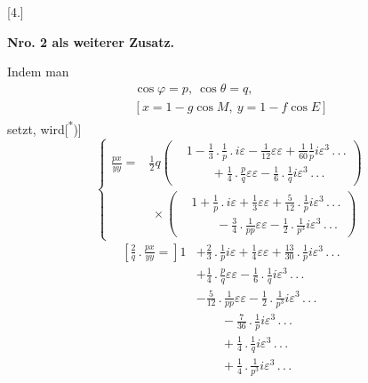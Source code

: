 \clearpage{}
\begingroup\makeatletter\let\veqno\@@leqno\makeatother
\newcommand{\vsroot}[1]{\mathord{\vcenter{\hbox{\Large\(\surd\)}}}#1}
\begin{center}[4.]\end{center}
\par
\begin{center}\textbf{Nro. 2 als weiterer Zusatz.}\end{center}
\noindent\hspace*{\parindent}Indem man
\begin{equation}\begin{gathered}
\cos\varphi=p,\ \cos\theta=q,\\
{}[x=1-g\cos M,\ y=1-f\cos E]
\end{gathered}\tag*{[30]}\end{equation}
\noindent setzt, wird[\textsuperscript{*})]
\begin{equation}\left\{\begin{aligned}
\frac{px}{yy}={}&\frac12q\left(\begin{aligned}
 &1-\frac13\,{.}\,\frac1p\,{.}\,i\varepsilon-\frac1{12}\varepsilon\varepsilon+\frac1{60}\frac1p i\varepsilon^3\,{.}\,{.}\,{.}\\
 &\qquad+\frac14\,{.}\,\frac pq\varepsilon\varepsilon-\frac16\,{.}\,\frac1q i\varepsilon^3\,{.}\,{.}\,{.}
\end{aligned}\right)\\
 &\ \times\left(\begin{aligned}
 &1+\frac1p\,{.}\,i\varepsilon+\frac13\varepsilon\varepsilon+\frac5{12}\,{.}\,\frac1p i\varepsilon^3\,{.}\,{.}\,{.}\\
 &\qquad-\frac34\,{.}\,\frac1{pp}\varepsilon\varepsilon-\frac12\,{.}\,\frac1{p^3}i\varepsilon^3\,{.}\,{.}\,{.}
\end{aligned}\right)
\end{aligned}\right.\tag*{[31]}\end{equation}
\[\begin{aligned}
\left[\frac2q\,{.}\,\frac{px}{yy}=\right]1
 &+\frac23\,{.}\,\frac1p i\varepsilon+\frac14\varepsilon\varepsilon+\frac{13}{30}\,{.}\,\frac1p i\varepsilon^3\,{.}\,{.}\,{.}\\
 &+\frac14\,{.}\,\frac pq\varepsilon\varepsilon-\frac16\,{.}\,\frac1q i\varepsilon^3\,{.}\,{.}\,{.}\\
 &-\frac5{12}\,{.}\,\frac1{pp}\varepsilon\varepsilon-\frac12\,{.}\,\frac1{p^3}i\varepsilon^3\,{.}\,{.}\,{.}\\
 &\qquad-\frac7{36}\,{.}\,\frac1p i\varepsilon^3\,{.}\,{.}\,{.}\\
 &\qquad+\frac14\,{.}\,\frac1q i\varepsilon^3\,{.}\,{.}\,{.}\\
 &\qquad+\frac14\,{.}\,\frac1{p^3}i\varepsilon^3\,{.}\,{.}\,{.}
\end{aligned}\]
